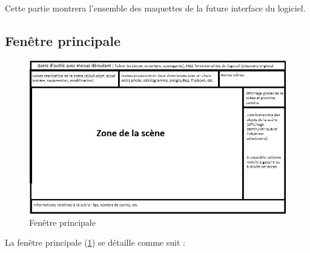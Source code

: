 Cette partie montrera l’ensemble des maquettes de la future interface du logiciel.

\subsection{Fenêtre principale}

\begin{figure}[H]
  \centering
  \includegraphics[scale=0.7]{fenetreprincipale}
  \caption{Fenêtre principale}
  \label{fig:fenppale}
\end{figure}

La fenêtre principale (\ref{fig:fenppale}) se détaille comme suit :

